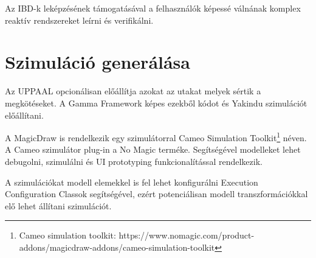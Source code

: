 Az IBD-k leképzésének támogatásával a felhasználók képessé válnának komplex reaktív rendszereket leírni és verifikálni.

\section{Szimuláció generálása}

Az UPPAAL opcionálisan előállítja azokat az utakat melyek sértik a megkötéseket. A Gamma Framework képes ezekből kódot és Yakindu szimulációt előállítani.

A MagicDraw is rendelkezik egy szimulátorral Cameo Simulation Toolkit\footnote{Cameo simulation toolkit: https://www.nomagic.com/product-addons/magicdraw-addons/cameo-simulation-toolkit} néven. A Cameo szimulátor plug-in a No Magic terméke. Segítségével modelleket lehet debugolni, szimulálni és UI prototyping funkcionalítással rendelkezik.

A szimulációkat modell elemekkel is fel lehet konfigurálni Execution Configuration Classok segítségével, ezért potenciálisan modell transzformációkkal elő lehet állítani szimulációt.

